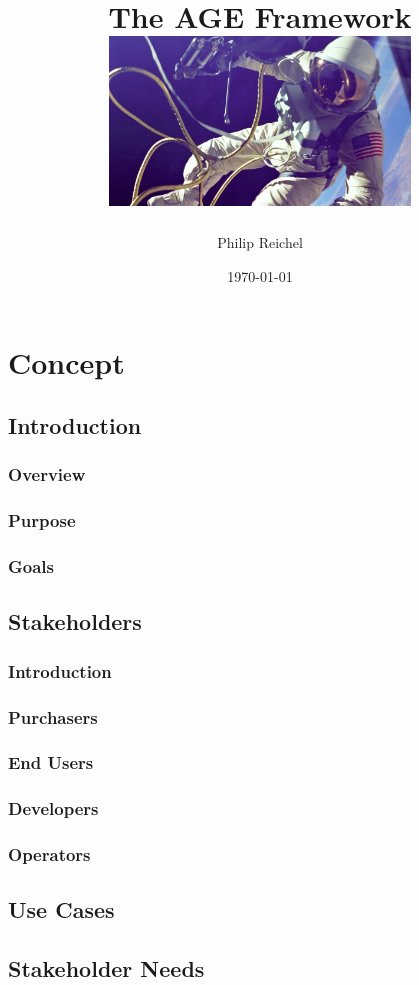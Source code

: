 \documentclass[a4paper,12pt]{book}
\title{
The AGE Framework
\linebreak
\linebreak
\includegraphics[width=8cm]{spacewalk.png}
}
\author{Philip Reichel}
\date{\today}
\begin{document}
\maketitle
\tableofcontents

\part{Concept}

\chapter{Introduction}

\section{Overview}
\section{Purpose}
\section{Goals}

\chapter{Stakeholders}
\section{Introduction}
\section{Purchasers}
\section{End Users}
\section{Developers}
\section{Operators}

\chapter{Use Cases}

\chapter{Stakeholder Needs}
\end{document}

